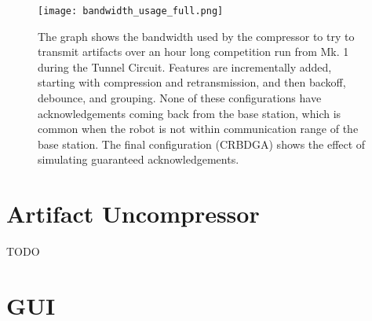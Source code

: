 \begin{figure}	
	
	\centering		
	\texttt{[image: bandwidth\_usage\_full.png]}
	\caption[Artifact transmission bandwidth usage]{The graph shows the bandwidth used by the compressor to try to transmit artifacts over an hour long competition run from Mk. 1 during the Tunnel Circuit. Features are incrementally added, starting with compression and retransmission, and then backoff, debounce, and grouping. None of these configurations have acknowledgements coming back from the base station, which is common when the robot is not within communication range of the base station. The final configuration (CRBDGA) shows the effect of simulating guaranteed acknowledgements.}
	\label{bandwidth_usage}
\end{figure}


\section{Artifact Uncompressor}

TODO

\section{GUI}